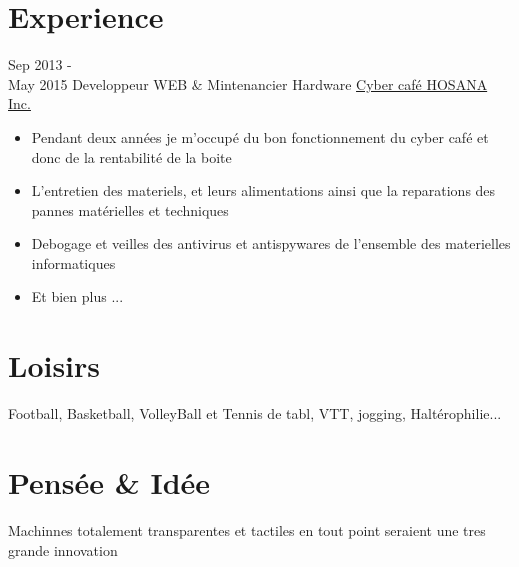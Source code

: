 \documentclass[letterpaper]{twentysecondcv} %
\begin{document}

\section{Experience}

\begin{twenty} %
	\twentyitem
    	{Sep 2013 - \\May 2015}
        {Developpeur WEB \& Mintenancier Hardware}
        {\href{https://www.facebook.com/pages/Cyber-Cafe-Hosannacom/111117482247094}{Cyber caf\'e HOSANA Inc.}}
        {}
        {
        {\begin{itemize}
        \item Pendant deux années je m'occup\'e du bon fonctionnement du cyber caf\'e et donc de la rentabilit\'e de la boite
        \item L'entretien des materiels, et leurs alimentations ainsi que la reparations des pannes mat\'erielles et techniques 
        \item Debogage et veilles des antivirus et antispywares de l'ensemble des materielles informatiques
        \item Et bien plus ...
    \end{itemize}}
        }
\end{twenty}

\section{Loisirs}

\begin{twenty} %
	\twentyitem
    	{}
        {}
        {}
        {}
        {Football, Basketball, VolleyBall et Tennis de tabl, VTT, jogging, Halt\'erophilie...}
\end{twenty}


\section{Pens\'ee \& Id\'ee}

\begin{twenty} %
	\twentyitem
    	{}
        {}
        {}
        {}
        {Machinnes totalement transparentes et tactiles en tout point seraient une tres grande innovation }
\end{twenty}
\end{document}
